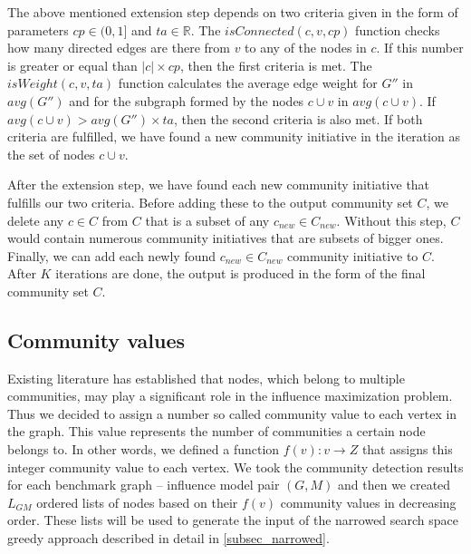 \documentclass[pdflatex,sn-mathphys-ay]{sn-jnl}
\begin{document}
The above mentioned extension step depends on two criteria given in the form of parameters $cp \in (0,1]$ and $ta \in \mathbb{R}$. The $isConnected(c,v,cp)$ function checks how many directed edges are there from $v$ to any of the nodes in $c$. If this number is greater or equal than $|c| \times cp$, then the first criteria is met. The $isWeight(c,v,ta)$ function calculates the average edge weight for $G''$ in $avg(G'')$ and for the subgraph formed by the nodes $c \cup v$ in $avg(c \cup v)$. If $avg(c \cup v) > avg(G'') \times ta$, then the second criteria is also met. If both criteria are fulfilled, we have found a new community initiative in the iteration as the set of nodes $c \cup v$.

After the extension step, we have found each new community initiative that fulfills our two criteria. Before adding these to the output community set $C$, we delete any $c \in C$ from $C$ that is a subset of any $c_{new} \in C_{new}$. Without this step, $C$ would contain numerous community initiatives that are subsets of bigger ones. Finally, we can add each newly found $c_{new} \in C_{new}$ community initiative to $C$. After $K$ iterations are done, the output is produced in the form of the final community set $C$.


\subsection{Community values}\label{subsec_commval}

Existing literature \citep{cim} has established that nodes, which belong to multiple communities, may play a significant role in the influence maximization problem. Thus we decided to assign a number so called community value to each vertex in the graph. This value represents the number of communities a certain node belongs to. In other words, we defined a function $f(v): v \rightarrow Z$ that assigns this integer community value to each vertex. We took the community detection results for each benchmark graph -- influence model pair $(G,M)$ and then we created $L_{GM}$ ordered lists of nodes based on their $f(v)$ community values in decreasing order. These lists will be used to generate the input of the narrowed search space greedy approach described in detail in \ref{subsec_narrowed}.

\end{document}
